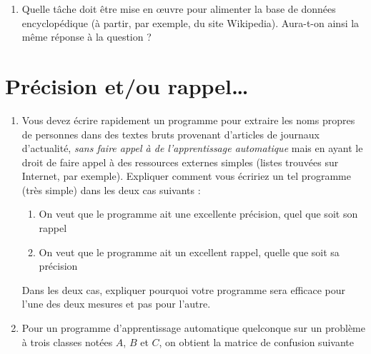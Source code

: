 \documentclass[a4paper, 11pt]{article}
\begin{document}
\begin{enumerate}[resume*]
    \item Quelle tâche doit être mise en œuvre pour alimenter la base de données encyclopédique (à
        partir, par exemple, du site Wikipedia). Aura-t-on ainsi la même réponse à la question ?
\end{enumerate}

\section{Précision et/ou rappel…}
\begin{enumerate}
    \item Vous devez écrire rapidement un programme pour extraire les noms propres de personnes dans
        des textes bruts provenant d'articles de journaux d'actualité, \emph{sans faire appel à de
        l'apprentissage automatique} mais en ayant le droit de faire appel à des ressources externes
        simples (listes trouvées sur Internet, par exemple). Expliquer comment vous écririez un tel
        programme (très simple) dans les deux cas suivants :
        \begin{enumerate}
            \item On veut que le programme ait une excellente précision, quel
              que soit son rappel
            \item On veut que le programme ait un excellent rappel, quelle que
              soit sa précision
        \end{enumerate}
        Dans les deux cas, expliquer pourquoi votre programme sera efficace
        pour l'une des deux mesures et pas pour l'autre.
    \item Pour un programme d'apprentissage automatique quelconque sur un problème à trois classes
        notées $A$, $B$ et $C$, on obtient la matrice de confusion suivante

        \begin{center}
\end{center}
\end{enumerate}
\end{document}
